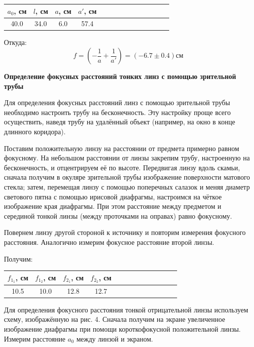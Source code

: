 \documentclass[14pt]{article}
\begin{document}
\begin{center}
\begin{tabular}{|c|c|c|c|c|c|c|c|c|c|c|c|c|c|}
\hline
$a_0$, см	&	$l$, см		&	$a$, см		&	$a'$, см	\\
\hline
40.0		&	34.0		&	6.0			&	57.4		\\
\hline
\end{tabular}
\end{center}

Откуда:
$$
	f = \left(-\frac{1}{a} + \frac{1}{a'}\right) = (-6.7 \pm 0.4)\text{см}
$$


\vspace{1cm}
\textbf{Определение фокусных расстояний тонких линз с помощью
зрительной трубы}

Для определения фокусных расстояний линз с помощью зрительной трубы
необходимо настроить трубу на бесконечность. Эту настройку проще
всего осуществить, наведя трубу на
удалённый объект (например, на
окно в конце длинного
коридора).

Поставим положительную линзу на расстоянии от предмета примерно
равном фокусному. На небольшом расстоянии от линзы закрепим трубу,
настроенную на бесконечность,
и отцентрируем её по высоте. Передвигая
линзу вдоль скамьи, сначала получим в окуляре зрительной трубы
изображение поверхности матового стекла; затем, перемещая линзу с
помощью поперечных салазок
и меняя диаметр светового пятна с помощью
ирисовой диафрагмы, настроимся на чёткое изображение края
диафрагмы. При этом расстояние между предметом
и серединой тонкой
линзы (между проточками на оправах) равно фокусному.

Повернем линзу другой стороной к источнику и повторим измерения фокусного расстояния. Аналогично измерим фокусное расстояние второй линзы.

Получим:
\begin{center}
\begin{tabular}{|c|c|c|c|c|c|c|c|c|c|c|c|c|}
\hline
$f_{1_1}$, см	&	$f_{1_2}$, см	&	$f_{2_1}$, см	&	$f_{2_2}$, см	\\
\hline
10.5			&	10.0			&	12.8			&	12.7			\\
\hline
\end{tabular}
\end{center}

Для определения фокусного расстояния тонкой отрицательной линзы используем
схему, изображённую на рис. 4. Сначала получим на экране
увеличенное изображение диафрагмы при помощи
короткофокусной положительной
линзы. Измерим расстояние
$a_0$ между линзой и экраном.
\end{document}
